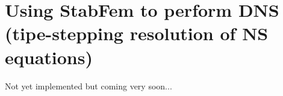 
\chapter{Using StabFem to perform DNS (tipe-stepping resolution of NS equations)}

Not yet implemented but coming very soon...

